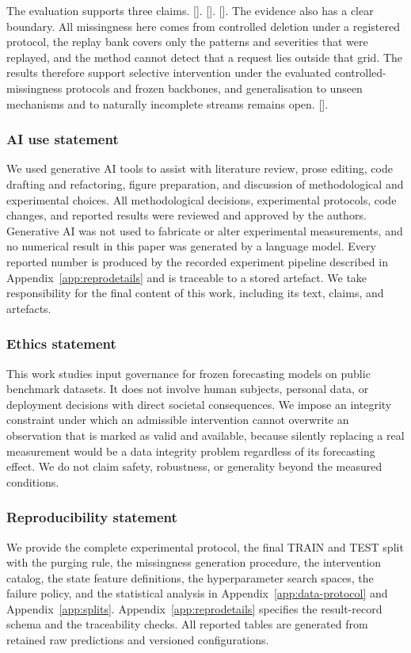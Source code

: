 \documentclass{article}
\newcommand{\ph}[1]{\textcolor{phgray}{\textsf{[\detokenize{#1}]}}}
\begin{document}
The evaluation supports three claims. \ph{CONCL_MAIN}. \ph{CONCL_HARM}. \ph{CONCL_TRANSFER}.
The evidence also has a clear boundary. All missingness here comes from controlled deletion
under a registered protocol, the replay bank covers only the patterns and severities that were
replayed, and the method cannot detect that a request lies outside that grid. The results
therefore support selective intervention under the evaluated controlled-missingness protocols
and frozen backbones, and generalisation to unseen mechanisms and to naturally incomplete
streams remains open. \ph{CONCLUSION_CLOSING}.

\subsubsection*{AI use statement}
We used generative AI tools to assist with literature review, prose editing, code drafting and
refactoring, figure preparation, and discussion of methodological and experimental choices.
All methodological decisions, experimental protocols, code changes, and reported results were
reviewed and approved by the authors. Generative AI was not used to fabricate or alter
experimental measurements, and no numerical result in this paper was generated by a language
model. Every reported number is produced by the recorded experiment pipeline described in
Appendix~\ref{app:reprodetails} and is traceable to a stored artefact. We take responsibility
for the final content of this work, including its text, claims, and artefacts.

\subsubsection*{Ethics statement}
This work studies input governance for frozen forecasting models on public benchmark datasets.
It does not involve human subjects, personal data, or deployment decisions with direct
societal consequences. We impose an integrity constraint under which an admissible
intervention cannot overwrite an observation that is marked as valid and available, because
silently replacing a real measurement would be a data integrity problem regardless of its
forecasting effect. We do not claim safety, robustness, or generality beyond the measured
conditions.

\subsubsection*{Reproducibility statement}
We provide the complete experimental protocol, the final TRAIN and TEST split with the
purging rule, the missingness generation procedure, the intervention catalog, the state
feature definitions, the hyperparameter search spaces, the failure policy, and the statistical
analysis in Appendix~\ref{app:data-protocol} and Appendix~\ref{app:splits}.
Appendix~\ref{app:reprodetails} specifies the result-record schema and the traceability checks.
All reported tables are generated from retained raw predictions and versioned configurations.
\end{document}
